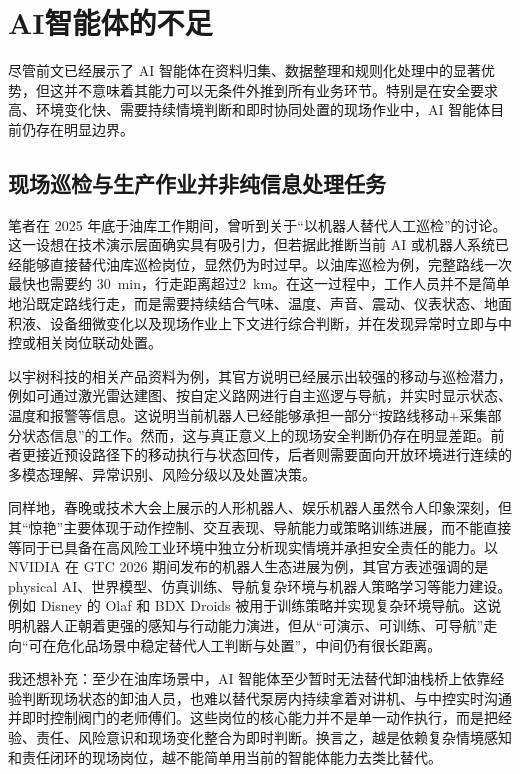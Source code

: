 \section{AI智能体的不足}

尽管前文已经展示了 AI 智能体在资料归集、数据整理和规则化处理中的显著优势，但这并不意味着其能力可以无条件外推到所有业务环节。特别是在安全要求高、环境变化快、需要持续情境判断和即时协同处置的现场作业中，AI 智能体目前仍存在明显边界。

\subsection{现场巡检与生产作业并非纯信息处理任务}

笔者在 2025 年底于油库工作期间，曾听到关于“以机器人替代人工巡检”的讨论。这一设想在技术演示层面确实具有吸引力，但若据此推断当前 AI 或机器人系统已经能够直接替代油库巡检岗位，显然仍为时过早。以油库巡检为例，完整路线一次最快也需要约 \SI{30}{\minute}，行走距离超过\SI{2}{\kilo\meter}。在这一过程中，工作人员并不是简单地沿既定路线行走，而是需要持续结合气味、温度、声音、震动、仪表状态、地面积液、设备细微变化以及现场作业上下文进行综合判断，并在发现异常时立即与中控或相关岗位联动处置。

以宇树科技的相关产品资料为例，其官方说明已经展示出较强的移动与巡检潜力，例如可通过激光雷达建图、按自定义路网进行自主巡逻与导航，并实时显示状态、温度和报警等信息\cite{unitree_b2_app_2025}。这说明当前机器人已经能够承担一部分“按路线移动+采集部分状态信息”的工作。然而，这与真正意义上的现场安全判断仍存在明显差距。前者更接近预设路径下的移动执行与状态回传，后者则需要面向开放环境进行连续的多模态理解、异常识别、风险分级以及处置决策。

同样地，春晚或技术大会上展示的人形机器人、娱乐机器人虽然令人印象深刻，但其“惊艳”主要体现于动作控制、交互表现、导航能力或策略训练进展，而不能直接等同于已具备在高风险工业环境中独立分析现实情境并承担安全责任的能力。以 NVIDIA 在 GTC 2026 期间发布的机器人生态进展为例，其官方表述强调的是 physical AI、世界模型、仿真训练、导航复杂环境与机器人策略学习等能力建设。例如 Disney 的 Olaf 和 BDX Droids 被用于训练策略并实现复杂环境导航\cite{nvidia_physical_ai_2026}。这说明机器人正朝着更强的感知与行动能力演进，但从“可演示、可训练、可导航”走向“可在危化品场景中稳定替代人工判断与处置”，中间仍有很长距离。

我还想补充：至少在油库场景中，AI 智能体至少暂时无法替代卸油栈桥上依靠经验判断现场状态的卸油人员，也难以替代泵房内持续拿着对讲机、与中控实时沟通并即时控制阀门的老师傅们。这些岗位的核心能力并不是单一动作执行，而是把经验、责任、风险意识和现场变化整合为即时判断。换言之，越是依赖复杂情境感知和责任闭环的现场岗位，越不能简单用当前的智能体能力去类比替代。

